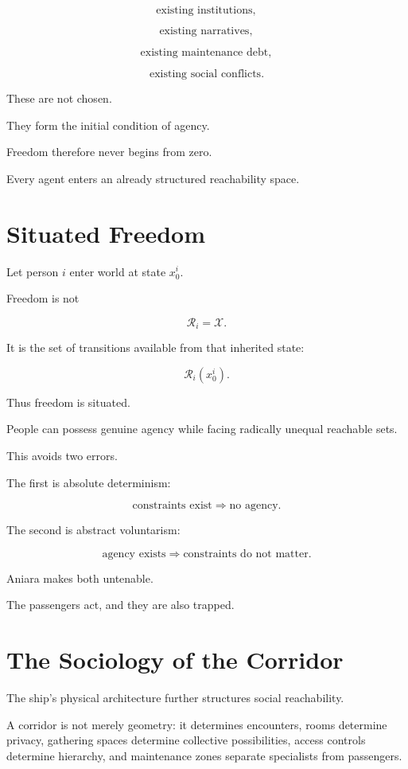 \documentclass[11pt,oneside]{book}
\theoremstyle{definition}
\theoremstyle{remark}
\newcommand{\R}{\mathcal{R}}
\begin{document}
\[
\text{existing institutions},
\]

\[
\text{existing narratives},
\]

\[
\text{existing maintenance debt},
\]

\[
\text{existing social conflicts}.
\]

These are not chosen.

They form the initial condition of agency.

Freedom therefore never begins from zero.

Every agent enters an already structured reachability space.

\section{Situated Freedom}

Let person \(i\) enter world at state \(x_0^i\).

Freedom is not

\[
\R_i=\mathcal X.
\]

It is the set of transitions available from that inherited state:

\[
\R_i(x_0^i).
\]

Thus freedom is situated.

People can possess genuine agency while facing radically unequal reachable sets.

This avoids two errors.

The first is absolute determinism:

\[
\text{constraints exist}
\Rightarrow
\text{no agency}.
\]

The second is abstract voluntarism:

\[
\text{agency exists}
\Rightarrow
\text{constraints do not matter}.
\]

Aniara makes both untenable.

The passengers act, and they are also trapped.

\section{The Sociology of the Corridor}

The ship's physical architecture further structures social reachability.

A corridor is not merely geometry: it determines encounters, rooms determine privacy, gathering spaces determine collective possibilities, access controls determine hierarchy, and maintenance zones separate specialists from passengers.
\end{document}
